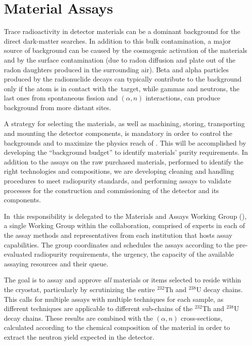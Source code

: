 \section{Material Assays}
\label{sec:Materials}

Trace radioactivity in detector materials can be a dominant background for the direct dark-matter searches. In addition to this bulk contamination, a major source of background can be caused by the cosmogenic activation of the materials and by the surface contamination (due to radon diffusion and plate out of the radon daughters produced in the surrounding air).
Beta and alpha particles produced by the radionuclide decays can typically contribute to the background only if the atom is in contact with the \LAr\,target, while gammas and neutrons, the last ones from spontaneous fission and $(\alpha,n)$ interactions, can produce background from more distant sites.

A strategy for selecting the materials, as well as machining, storing, transporting and mounting the detector components, is mandatory in order to control the backgrounds and to maximize the physics reach of \DSks. This will be accomplished by developing the ``background budget'' to identify materials' purity requirements. In addition to the assays on the raw purchased materials, performed to identify the right technologies and compositions, we are developing cleaning and handling procedures to meet radiopurity standards, and performing assays to validate processes for the construction and commissioning of the detector and its components.

In \DSks\,this responsibility is delegated to the Materials and Assays Working Group (\MAWG), a single Working Group within the collaboration, comprised of experts in each of the assay methods and representatives from each institution that hosts assay capabilities. The group coordinates and schedules the assays according to the pre-evaluated radiopurity requirements, the urgency, the capacity of the available assaying resources and their queue.

The goal is to assay and approve {\it all} materials or items selected to reside within the cryostat, particularly by scrutinizing the entire $^{232}$Th and $^{238}$U decay chains. This calls for multiple assays with multiple techniques for each sample, as different techniques are applicable to different sub-chains of the $^{232}$Th and $^{238}$U decay chains. These results are combined with the $(\alpha,n)$ cross-sections, calculated according to the chemical composition of the material in order to extract the neutron yield expected in the detector.


